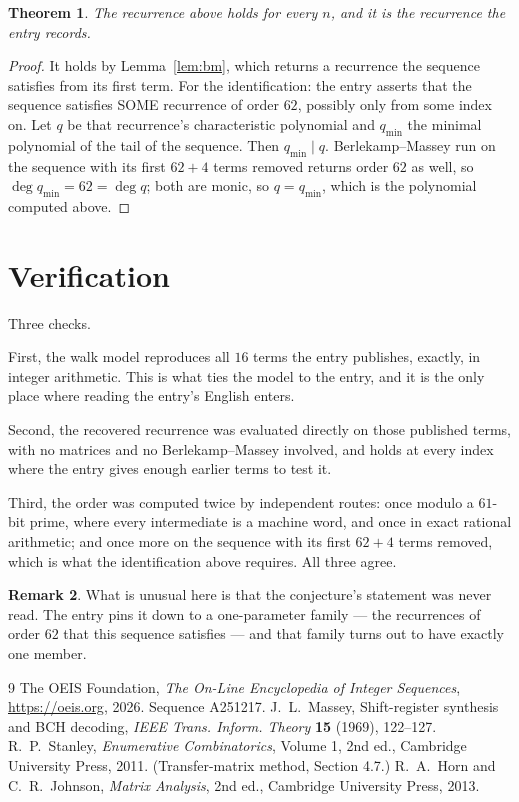 \documentclass[11pt,a4paper]{article}
\theoremstyle{plain}
\newtheorem{theorem}{Theorem}
\theoremstyle{definition}
\newtheorem{remark}[theorem]{Remark}
\begin{document}
\begin{theorem}
The recurrence above holds for every $n$, and it is the recurrence the entry records.
\end{theorem}

\begin{proof}
It holds by Lemma~\ref{lem:bm}, which returns a recurrence the sequence satisfies from its
first term. For the identification: the entry asserts that the sequence satisfies SOME
recurrence of order $62$, possibly only from some index on. Let $q$ be that recurrence's
characteristic polynomial and $q_{\min}$ the minimal polynomial of the tail of the sequence.
Then $q_{\min}\mid q$. Berlekamp--Massey run on the sequence with its first $62+4$ terms
removed returns order $62$ as well, so $\deg q_{\min}=62=\deg q$; both are monic, so
$q=q_{\min}$, which is the polynomial computed above.
\end{proof}

\section{Verification}

Three checks.

First, the walk model reproduces all $16$ terms the entry publishes, exactly, in integer
arithmetic. This is what ties the model to the entry, and it is the only place where reading
the entry's English enters.

Second, the recovered recurrence was evaluated directly on those published terms, with no
matrices and no Berlekamp--Massey involved, and holds at every index where the entry gives
enough earlier terms to test it.

Third, the order was computed twice by independent routes: once modulo a $61$-bit prime, where
every intermediate is a machine word, and once in exact rational arithmetic; and once more on
the sequence with its first $62+4$ terms removed, which is what the identification above
requires. All three agree.

\begin{remark}
What is unusual here is that the conjecture's statement was never read. The entry pins it down
to a one-parameter family --- the recurrences of order $62$ that this sequence satisfies
--- and that family turns out to have exactly one member.
\end{remark}

\begin{thebibliography}{9}
 The OEIS Foundation, \emph{The On-Line Encyclopedia of Integer
Sequences}, \url{https://oeis.org}, 2026. Sequence A251217.
 J.~L.~Massey, Shift-register synthesis and BCH decoding, \emph{IEEE
Trans. Inform. Theory} \textbf{15} (1969), 122--127.
 R.~P.~Stanley, \emph{Enumerative Combinatorics}, Volume 1, 2nd ed.,
Cambridge University Press, 2011. (Transfer-matrix method, Section 4.7.)
 R.~A.~Horn and C.~R.~Johnson, \emph{Matrix Analysis}, 2nd ed., Cambridge
University Press, 2013.
\end{thebibliography}
\end{document}
